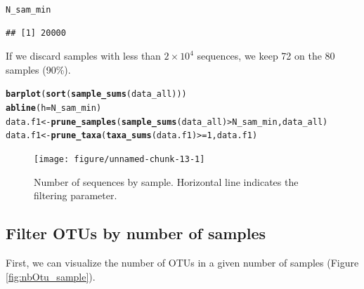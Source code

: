 \documentclass[12pt]{article}\usepackage[]{graphicx}\usepackage[]{color}
\makeatletter
\newcommand{\hlnum}[1]{\textcolor[rgb]{0.686,0.059,0.569}{#1}}%
\newcommand{\hlopt}[1]{\textcolor[rgb]{0,0,0}{#1}}%
\newcommand{\hlstd}[1]{\textcolor[rgb]{0.345,0.345,0.345}{#1}}%
\newcommand{\hlkwb}[1]{\textcolor[rgb]{0.69,0.353,0.396}{#1}}%
\newcommand{\hlkwc}[1]{\textcolor[rgb]{0.333,0.667,0.333}{#1}}%
\newcommand{\hlkwd}[1]{\textcolor[rgb]{0.737,0.353,0.396}{\textbf{#1}}}%
\newenvironment{kframe}{%
 \def\at@end@of@kframe{}%
 \ifinner\ifhmode%
  \def\at@end@of@kframe{\end{minipage}}%
  \begin{minipage}{\columnwidth}%
 \fi\fi%
 \def\FrameCommand##1{\hskip\@totalleftmargin \hskip-\fboxsep
 \colorbox{shadecolor}{##1}\hskip-\fboxsep
     \hskip-\linewidth \hskip-\@totalleftmargin \hskip\columnwidth}%
 \MakeFramed {\advance\hsize-\width
   \@totalleftmargin\z@ \linewidth\hsize
   \@setminipage}}%
 {\par\unskip\endMakeFramed%
 \at@end@of@kframe}
\newenvironment{knitrout}{}{} %
\numberwithin{figure}{section}
\makeatother
\begin{document}
\begin{knitrout}\small
{}\color{fgcolor}\begin{kframe}
\begin{alltt}
\hlstd{N_sam_min}
\end{alltt}
\begin{verbatim}
## [1] 20000
\end{verbatim}
\end{kframe}
\end{knitrout}

If we discard samples with less than \ensuremath{2\times 10^{4}} sequences, we keep 72 on the 80 samples (90\%).

\begin{knitrout}\small
{}\color{fgcolor}\begin{kframe}
\begin{alltt}
\hlkwd{barplot}\hlstd{(}\hlkwd{sort}\hlstd{(}\hlkwd{sample_sums}\hlstd{(data_all)))}
\hlkwd{abline}\hlstd{(}\hlkwc{h} \hlstd{= N_sam_min)}
\hlstd{data.f1} \hlkwb{<-} \hlkwd{prune_samples}\hlstd{(}\hlkwd{sample_sums}\hlstd{(data_all)} \hlopt{>} \hlstd{N_sam_min, data_all)}
\hlstd{data.f1} \hlkwb{<-} \hlkwd{prune_taxa}\hlstd{(}\hlkwd{taxa_sums}\hlstd{(data.f1)} \hlopt{>=}  \hlnum{1}\hlstd{, data.f1)}
\end{alltt}
\end{kframe}\begin{figure}

{\centering \texttt{[image: figure/unnamed-chunk-13-1]} 

}

\caption[Number of sequences by sample]{Number of sequences by sample. Horizontal line indicates the filtering parameter.}\label{fig:unnamed-chunk-13}
\end{figure}


\end{knitrout}

  \subsection{Filter OTUs by number of samples}

First, we can visualize the number of OTUs in a given number of samples (Figure \ref{fig:nbOtu_sample}).
\end{document}
